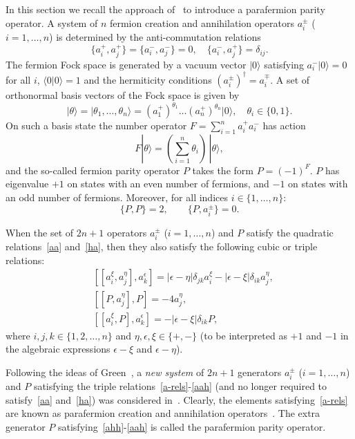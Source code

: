 \documentclass{SciPost}
\begin{document}
In this section we recall the approach of~\cite{SV2026} to introduce a parafermion parity operator.
A system of $n$ fermion creation and annihilation operators $a_i^\pm$ ($i=1,\ldots,n$) is determined by the anti-commutation relations
\begin{equation}
 \{ a_i^+,a_j^+\} = \{ a_i^-,a_j^-\} = 0, \quad \{ a_i^-,a_j^+\} = \delta_{ij}.
\label{aa}
\end{equation}
The fermion Fock space is generated by a vacuum vector $|0\rangle$ satisfying
$a_i^- |0\rangle =0$ for all $i$, $\langle 0 | 0\rangle = 1$ and the hermiticity conditions $(a_i^\pm)^\dagger = a_i^\mp$.
A set of orthonormal basis vectors of the Fock space is given by
\begin{equation}
|\theta\rangle = |\theta_1,\ldots,\theta_n\rangle= (a_1^+)^{\theta_1}\ldots (a_n^+)^{\theta_n} |0\rangle,
\quad \theta_i\in\{ 0,1\}.
\label{theta}
\end{equation}
On such a basis state the number operator $F=\sum_{i=1}^n a_i^+a_i^-$ has action
\begin{equation}
F |\theta\rangle = (\sum_{i=1}^n \theta_i)\, |\theta\rangle,
\end{equation}
and the so-called fermion parity operator $P$ takes the form $P=(-1)^F$. $P$ has eigenvalue $+1$ on states with an even number of fermions, 
and $-1$ on states with an odd number of fermions.
Moreover, for all indices $i\in\{1,\ldots,n\}$:
\begin{equation}
\{P,P\}=2,\qquad \{ P, a_i^\pm\}=0.
\label{ha}
\end{equation}

When the set of $2n+1$ operators $a_i^\pm$ ($i=1,\ldots,n$) and $P$ satisfy the quadratic relations~\eqref{aa} and~\eqref{ha}, 
then they also satisfy the following cubic or triple relations:
\begin{align}
& [[a_{i}^{\xi}, a_{j}^{\eta}], a_{k}^{\epsilon}]=
|\epsilon -\eta| \delta_{jk} a_{i}^{\xi} - |\epsilon -\xi| \delta_{ik}a_{j}^{\eta}, 
\label{a-rels} \\
& [[P,a_j^\eta],P]=-4 a_j^\eta, \label{ahh}\\
& [[a_i^\xi,P],a^\epsilon_k]= - |\epsilon-\xi| \delta_{ik} P, \label{aah}
\end{align}
where $i,j,k\in \{1,2,\ldots,n\}$ and $\eta, \epsilon, \xi \in\{+,-\}$ (to be interpreted as $+1$ and $-1$
in the algebraic expressions $\epsilon -\xi$ and $\epsilon -\eta$).

Following the ideas of Green~\cite{Green}, a {\em new system} of $2n+1$ generators $a_i^\pm$ ($i=1,\ldots,n$) and $P$ satisfying the triple relations~\eqref{a-rels}-\eqref{aah} (and  no longer required to satisfy~\eqref{aa} and~\eqref{ha}) was considered in~\cite{SV2026}. 
Clearly, the elements satisfying~\eqref{a-rels} are known as parafermion creation and annihilation operators~\cite{Green}.
The extra generator $P$ satisfying~\eqref{ahh}-\eqref{aah} is called the parafermion parity operator.
\end{document}
